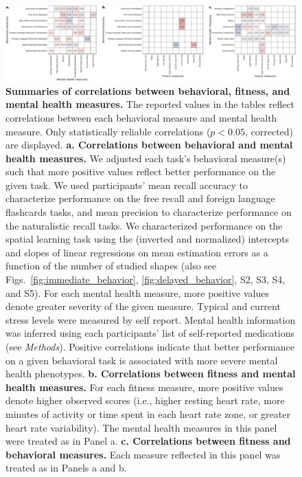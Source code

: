 \documentclass[10pt]{article}
\newcommand{\frDetail}{S2}
\newcommand{\natDetail}{S3}
\newcommand{\vocabDetail}{S4}
\newcommand{\spatialDetail}{S5}
\begin{document}
\begin{figure}[tp]
\centering
\includegraphics[width=\textwidth]{figs/combined_correlations_main}
\caption{\textbf{Summaries of correlations between behavioral, fitness, and mental
 health measures.}  The reported values in the tables reflect correlations
  between each behavioral measure and mental health measure.
  Only statistically reliable correlations ($p < 0.05$, corrected) are displayed.
  \textbf{a. Correlations between behavioral and mental health measures.}
  We adjusted each task's behavioral measure(s) such that more positive values reflect
  better performance on the given task.  We used participants' mean recall accuracy to characterize
  performance on the free recall and
  foreign language flashcards tasks, and mean precision to
  characterize performance on the naturalistic recall tasks.  We
  characterized performance on the spatial learning task using the
  (inverted and normalized)
  intercepts and slopes of linear regressions on mean estimation
  errors as a function of the number of studied shapes (also see
  Figs.~\ref{fig:immediate_behavior}, \ref{fig:delayed_behavior},
  \frDetail, \natDetail, \vocabDetail, and \spatialDetail).  For each mental health
  measure, more positive values denote greater severity of the given measure.  Typical
  and current stress levels were measured by self report.  Mental
  health information was inferred using each participants' list of
  self-reported medications (see \textit{Methods}).  Positive correlations indicate that
  better performance on a given behavioral task is associated with more severe 
  mental health phenotypes.  \textbf{b. Correlations between fitness
  and mental health measures.}  For each fitness measure, more positive
  values denote higher observed scores (i.e., higher resting heart rate,
  more minutes of activity or time spent in each heart rate zone, or greater heart rate variability).
  The mental health measures in this panel were treated as in Panel a.
  \textbf{c. Correlations between fitness and behavioral measures.}
  Each measure reflected in this panel was treated as in Panels a and b.}
\label{fig:corr_summaries}
\end{figure}
\end{document}
